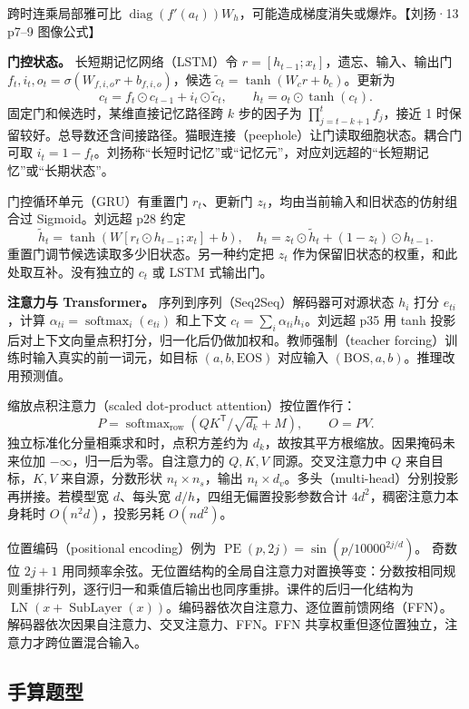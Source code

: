 \documentclass[UTF8,a4paper,zihao=-4,fontset=fandol]{ctexart}
\begin{document}
跨时连乘局部雅可比 $\operatorname{diag}(f'(a_t))W_h$，可能造成梯度消失或爆炸。【刘扬·13 p7--9 图像公式】

\textbf{门控状态。} 长短期记忆网络（LSTM）令 $r=[h_{t-1};x_t]$，遗忘、输入、输出门 $f_t,i_t,o_t=\sigma(W_{f,i,o}r+b_{f,i,o})$，候选 $\tilde c_t=\tanh(W_cr+b_c)$。更新为
\[
 c_t=f_t\odot c_{t-1}+i_t\odot\tilde c_t,\qquad
 h_t=o_t\odot\tanh(c_t).
\]
固定门和候选时，某维直接记忆路径跨 $k$ 步的因子为 $\prod_{j=t-k+1}^t f_j$，接近 1 时保留较好。总导数还含间接路径。猫眼连接（peephole）让门读取细胞状态。耦合门可取 $i_t=1-f_t$。刘扬称“长短时记忆”或“记忆元”，对应刘远超的“长短期记忆”或“长期状态”。

门控循环单元（GRU）有重置门 $r_t$、更新门 $z_t$，均由当前输入和旧状态的仿射组合过 Sigmoid。刘远超 p28 约定
\[
 \tilde h_t=\tanh(W[r_t\odot h_{t-1};x_t]+b),\quad
 h_t=z_t\odot\tilde h_t+(1-z_t)\odot h_{t-1}.
\]
重置门调节候选读取多少旧状态。另一种约定把 $z_t$ 作为保留旧状态的权重，和此处取互补。没有独立的 $c_t$ 或 LSTM 式输出门。

\textbf{注意力与 Transformer。} 序列到序列（Seq2Seq）解码器可对源状态 $h_i$ 打分 $e_{ti}$，计算 $\alpha_{ti}=\operatorname{softmax}_i(e_{ti})$ 和上下文 $c_t=\sum_i\alpha_{ti}h_i$。刘远超 p35 用 tanh 投影后对上下文向量点积打分，归一化后仍做加权和。教师强制（teacher forcing）训练时输入真实的前一词元，如目标 $(a,b,\mathrm{EOS})$ 对应输入 $(\mathrm{BOS},a,b)$。推理改用预测值。

缩放点积注意力（scaled dot-product attention）按位置作行：
\[
 P=\operatorname{softmax}_{\mathrm{row}}
   (QK^{\mathsf T}/\sqrt{d_k}+M),\qquad O=PV.
\]
独立标准化分量相乘求和时，点积方差约为 $d_k$，故按其平方根缩放。因果掩码未来位加 $-\infty$，归一后为零。自注意力的 $Q,K,V$ 同源。交叉注意力中 $Q$ 来自目标，$K,V$ 来自源，分数形状 $n_t\times n_s$，输出 $n_t\times d_v$。多头（multi-head）分别投影再拼接。若模型宽 $d$、每头宽 $d/h$，四组无偏置投影参数合计 $4d^2$，稠密注意力本身耗时 $O(n^2d)$，投影另耗 $O(nd^2)$。

位置编码（positional encoding）例为
$\operatorname{PE}(p,2j)=\sin(p/10000^{2j/d})$。
奇数位 $2j+1$ 用同频率余弦。无位置结构的全局自注意力对置换等变：分数按相同规则重排行列，逐行归一和乘值后输出也同序重排。课件的后归一化结构为 $\operatorname{LN}(x+\operatorname{SubLayer}(x))$。编码器依次自注意力、逐位置前馈网络（FFN）。解码器依次因果自注意力、交叉注意力、FFN。FFN 共享权重但逐位置独立，注意力才跨位置混合输入。

\subsection{手算题型}
\end{document}

